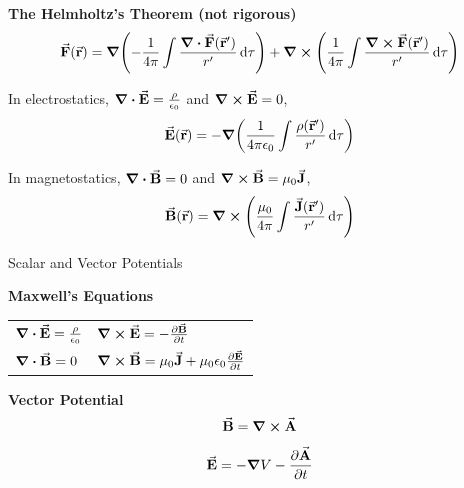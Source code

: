 \documentclass[9pt]{beamer}
\begin{document}
\begin{frame}
    \begin{beamerboxesrounded}[shadow=true]{\bf The Helmholtz's Theorem (not rigorous)}
        \begin{equation}
            \va{F}(\va{r}) = \grad(-\frac{1}{4\pi} \int \frac{\div{\va{F}(\va{r}')}}{r'}\dd{\tau}) + \curl(\frac{1}{4\pi} \int \frac{\curl{\va{F}(\va{r}')}}{r'}\dd{\tau})
        \end{equation}
    \end{beamerboxesrounded}

    In electrostatics, $\div{\va{E}} = \frac{\rho}{\epsilon_0}$ and $\curl{\va{E}} = 0$,
    \begin{equation}
        \va{E}(\va{r}) = -\grad(\frac{1}{4\pi\epsilon_0} \int \frac{\rho(\va{r}')}{r'} \dd{\tau})
    \end{equation}

    In magnetostatics, $\div{\va{B}} = 0$ and $\curl{\va{B}} = \mu_0 \va{J}$,
    \begin{equation}
        \va{B}(\va{r}) = \curl(\frac{\mu_0}{4\pi} \int \frac{\va{J}(\va{r}')}{r'} \dd{\tau})
    \end{equation}


\end{frame}

\begin{frame}{Scalar and Vector Potentials}
    \begin{beamerboxesrounded}[shadow=true]{\bf Maxwell's Equations}
        \begin{table}[htbp]
            \centering
            \begin{tabular}{ll}
            \addlinespace[1em]
            $\div{\va{E}} = \frac{\rho}{\epsilon_0}$ & $\curl{\va{E}}=-\pdv{\va{B}}{t}$ \\ \addlinespace[1em]
             $\div{\va{B}} = 0$ & $\curl{\va{B}}=\mu_0 \va{J}+ \mu_0 \epsilon_0 \pdv{\va{E}}{t}$ 
            \end{tabular}
        \end{table}
    \end{beamerboxesrounded}
    \vspace{.5em}
    \begin{beamerboxesrounded}[shadow=true]{\bf Vector Potential}
        \begin{equation}
            \va{B} = \curl \va{A}
        \end{equation}
        \begin{equation}
            \va{E} = -\grad V - \pdv{\va{A}}{t}
        \end{equation}
    \end{beamerboxesrounded}
\end{frame}
\end{document}

